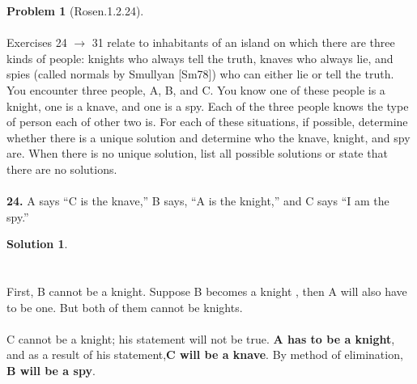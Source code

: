\documentclass{article}
\theoremstyle{definition}
\newtheorem*{problem}{Problem}
\newtheorem*{solution}{Solution}
\begin{document}
\begin{problem}[Rosen.1.2.24]\ \\
\ \\
Exercises 24 $\rightarrow$ 31 relate to inhabitants of an island on which
there are three kinds of people: knights who always tell the
truth, knaves who always lie, and spies (called normals by
Smullyan [Sm78]) who can either lie or tell the truth. You
encounter three people, A, B, and C. You know one of these
people is a knight, one is a knave, and one is a spy. Each of the
three people knows the type of person each of other two is. For
each of these situations, if possible, determine whether there
is a unique solution and determine who the knave, knight, and
spy are. When there is no unique solution, list all possible
solutions or state that there are no solutions.\ \\
\ \\
\textbf{24.} A says “C is the knave,” B says, “A is the knight,” and C
says “I am the spy.”
\begin{compactenum}
\renewcommand{\theenumi}{\alph{enumi}}

\end{compactenum}
\end{problem}

\begin{solution}\ \\
\ \\
\ \\
\noindent
First, B cannot be a knight. Suppose B becomes a knight , then A will also have to be one. But both of them cannot be knights.\ \\
\ \\
C cannot be a knight; his statement will not be true. \textbf{A has to be a knight}, and as a result of his statement,\textbf{C will be a knave}. By method of elimination, \textbf{B will be a spy}. 



\begin{compactenum}
\renewcommand{\theenumi}{\alph{enumi}}


\end{compactenum}
\end{solution}
\end{document}
